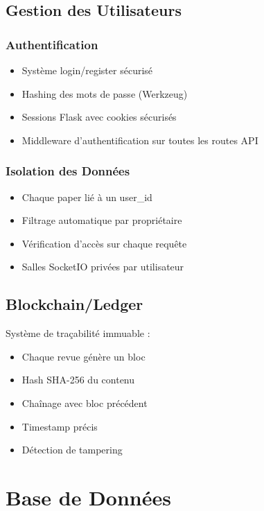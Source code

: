 \documentclass[12pt,a4paper]{article}
\begin{document}
\subsection{Gestion des Utilisateurs}

\subsubsection{Authentification}
\begin{itemize}
    \item Système login/register sécurisé
    \item Hashing des mots de passe (Werkzeug)
    \item Sessions Flask avec cookies sécurisés
    \item Middleware d'authentification sur toutes les routes API
\end{itemize}

\subsubsection{Isolation des Données}
\begin{itemize}
    \item Chaque paper lié à un user\_id
    \item Filtrage automatique par propriétaire
    \item Vérification d'accès sur chaque requête
    \item Salles SocketIO privées par utilisateur
\end{itemize}

\subsection{Blockchain/Ledger}

Système de traçabilité immuable :
\begin{itemize}
    \item Chaque revue génère un bloc
    \item Hash SHA-256 du contenu
    \item Chaînage avec bloc précédent
    \item Timestamp précis
    \item Détection de tampering
\end{itemize}

\section{Base de Données}
\end{document}
